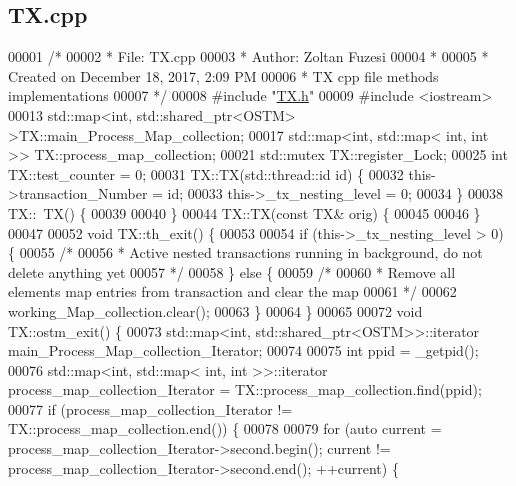 \hypertarget{_t_x_8cpp_source}{}\subsection{T\+X.\+cpp}

\begin{DoxyCode}
00001 \textcolor{comment}{/* }
00002 \textcolor{comment}{ * File:   TX.cpp}
00003 \textcolor{comment}{ * Author: Zoltan Fuzesi}
00004 \textcolor{comment}{ * }
00005 \textcolor{comment}{ * Created on December 18, 2017, 2:09 PM}
00006 \textcolor{comment}{ * TX cpp file methods implementations}
00007 \textcolor{comment}{ */}
00008 \textcolor{preprocessor}{#include "\hyperlink{_t_x_8h}{TX.h}"}
00009 \textcolor{preprocessor}{#include <iostream>}
00013 std::map<int, std::shared\_ptr<OSTM> >TX::main\_Process\_Map\_collection;
00017 std::map<int, std::map< int, int >> TX::process\_map\_collection;
00021 std::mutex TX::register\_Lock;
00025 \textcolor{keywordtype}{int} TX::test\_counter = 0;
00031 TX::TX(std::thread::id \textcolor{keywordtype}{id}) \{
00032     this->transaction\_Number = id;
00033     this->\_tx\_nesting\_level = 0;
00034 \}
00038 TX::~TX() \{
00039    
00040 \}
00044 TX::TX(\textcolor{keyword}{const} TX& orig) \{
00045 
00046 \}
00047 
00052 \textcolor{keywordtype}{void} TX::th\_exit() \{
00053 
00054     \textcolor{keywordflow}{if} (this->\_tx\_nesting\_level > 0) \{
00055         \textcolor{comment}{/*}
00056 \textcolor{comment}{         * Active nested transactions running in background, do not delete anything yet}
00057 \textcolor{comment}{         */}
00058     \} \textcolor{keywordflow}{else} \{
00059         \textcolor{comment}{/* }
00060 \textcolor{comment}{         * Remove all elements map entries from transaction and clear the map}
00061 \textcolor{comment}{         */}
00062         working\_Map\_collection.clear();
00063     \}
00064 \}
00065 
00072 \textcolor{keywordtype}{void} TX::ostm\_exit() \{
00073     std::map<int, std::shared\_ptr<OSTM>>::iterator main\_Process\_Map\_collection\_Iterator;
00074      
00075     \textcolor{keywordtype}{int} ppid = \_getpid();
00076     std::map<int, std::map< int, int >>::iterator process\_map\_collection\_Iterator = 
      TX::process\_map\_collection.find(ppid);
00077     \textcolor{keywordflow}{if} (process\_map\_collection\_Iterator != TX::process\_map\_collection.end()) \{
00078 
00079         \textcolor{keywordflow}{for} (\textcolor{keyword}{auto} current = process\_map\_collection\_Iterator->second.begin(); current != 
      process\_map\_collection\_Iterator->second.end(); ++current) \{

\end{DoxyCode}
